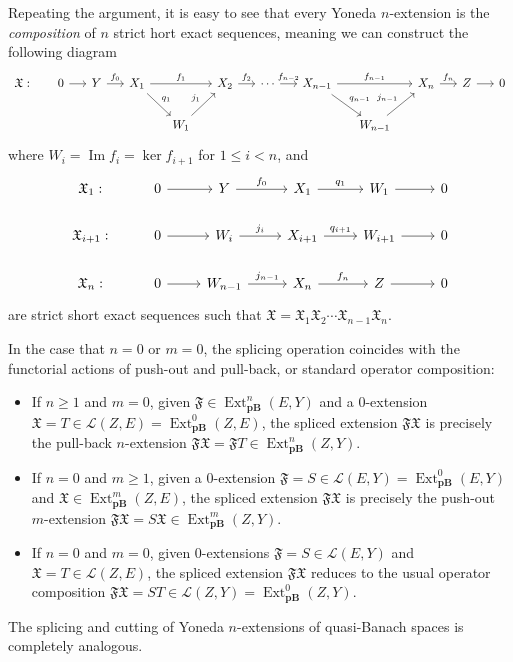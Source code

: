 \documentclass[12pt,a4paper]{amsproc}
\theoremstyle{remark}
\theoremstyle{definition}
\renewcommand\Im{\operatorname{Im}}
\newcommand{\Ext}{\operatorname{Ext}}
\newcommand{\pBan}{\operatorname{\textbf{pB}}}
\numberwithin{equation}{section}
\begin{document}
	Repeating the argument, it is easy to see that every Yoneda $n$-extension is the \emph{composition} of $n$ strict hort exact sequences, meaning we can construct the following diagram  
	\begin{equation}
	\notag
	\begin{tikzcd}[column sep=0.5cm]
		\mathfrak{X}: & 0 \arrow[r] & Y \arrow[r, "f_0"] & X_1 \arrow[rr, "f_1"] \arrow[rd, "q_1"] & & X_2 \arrow[r, "f_2"] & \cdots \arrow[r, "f_{n-2}"] & X_{n-1} \arrow[rr, "f_{n-1}"] \arrow[rd, "q_{n-1}"] & & X_n \arrow[r, "f_n"] & Z \arrow[r] & 0 \\
		& & & & W_1 \arrow[ru, "j_1"] & & & & W_{n-1} \arrow[ru, "j_{n-1}"] & & &
	\end{tikzcd}
\end{equation}
	where $W_i=\Im f_i=\ker f_{i+1}$ for $1\leq i < n$, and
	\begin{equation}
	\notag
	\begin{tikzcd}
		\mathfrak{X}_1: & 0 \arrow[r] & Y \arrow[r, "f_0"] & X_1 \arrow[r, "q_1"] & W_1 \arrow[r] & 0 \\
		\mathfrak{X}_{i+1}: & 0 \arrow[r] & W_i \arrow[r, "j_i"] & X_{i+1} \arrow[r, "q_{i+1}"] & W_{i+1} \arrow[r] & 0 \\
		\mathfrak{X}_n: & 0 \arrow[r] & W_{n-1} \arrow[r, "j_{n-1}"] & X_n \arrow[r, "f_n"] & Z \arrow[r] & 0
	\end{tikzcd}
\end{equation}
	are strict short exact sequences such that $\mathfrak{X}=\mathfrak{X}_1 \mathfrak{X}_2 \cdots \mathfrak{X}_{n-1} \mathfrak{X}_n$.
    \par In the case that $n=0$ or $m=0$, the splicing operation coincides with the functorial actions of push-out and pull-back, or standard operator composition:
\begin{itemize}
    \item[i)] If $n \ge 1$ and $m = 0$, given $\mathfrak{F} \in \Ext^n_{\boldsymbol{\pBan}}(E,Y)$ and a $0$-extension $\mathfrak{X}=T \in \mathcal{L}(Z,E) = \Ext^0_{\boldsymbol{\pBan}}(Z,E)$, the spliced extension $\mathfrak{F}\mathfrak{X}$ is precisely the pull-back $n$-extension $\mathfrak{F}\mathfrak{X} = \mathfrak{F}T \in \Ext^n_{\boldsymbol{\pBan}}(Z,Y)$.
    \item[ii)] If $n = 0$ and $m \ge 1$, given a $0$-extension $\mathfrak{F} = S \in \mathcal{L}(E,Y) =\Ext^0_{\boldsymbol{\pBan}}(E,Y)$ and $\mathfrak{X} \in \Ext^m_{\boldsymbol{\pBan}}(Z,E)$, the spliced extension $\mathfrak{F}\mathfrak{X}$ is precisely the push-out $m$-extension $\mathfrak{F}\mathfrak{X}=S\mathfrak{X} \in \Ext^m_{\boldsymbol{\pBan}}(Z,Y)$.
    \item[iii)] If $n = 0$ and $m = 0$, given $0$-extensions $\mathfrak{F} = S \in \mathcal{L}(E,Y)$ and $\mathfrak{X} = T \in \mathcal{L}(Z,E)$, the spliced extension $\mathfrak{F}\mathfrak{X}$ reduces to the usual operator composition $\mathfrak{F}\mathfrak{X} = S T \in \mathcal{L}(Z,Y)= \Ext^0_{\boldsymbol{\pBan}}(Z,Y).$
\end{itemize}
The splicing and cutting of Yoneda $n$-extensions of quasi-Banach spaces is completely analogous.
\end{document}
